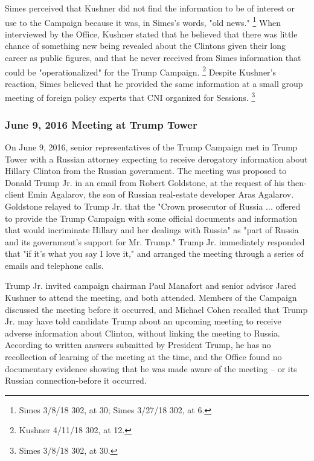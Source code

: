 Simes perceived that Kushner did not find the information to be of interest or use to the Campaign because it was, in Simes's words, "old news."%
\footnote{Simes 3/8/18 302, at 30; 
Simes 3/27/18 302, at 6.}
When interviewed by the Office, Kushner stated that he believed that there was little chance of something new being revealed about the Clintons given their long career as public figures, and that he never received from Simes information that could be "operationalized" for the Trump Campaign.%
\footnote{Kushner 4/11/18 302, at 12.}
Despite Kushner's reaction, Simes believed that he provided the same information at a small group meeting of foreign policy experts that CNI organized for Sessions.%
\footnote{Simes 3/8/18 302, at 30.}

\subsubsection{June 9, 2016 Meeting at Trump Tower}

On June 9, 2016, senior representatives of the Trump Campaign met in Trump Tower with a Russian attorney expecting to receive derogatory information about Hillary Clinton from the Russian government.
The meeting was proposed to Donald Trump Jr. in an email from Robert Goldstone, at the request of his then-client Emin Agalarov, the son of Russian real-estate developer Aras Agalarov.
Goldstone relayed to Trump Jr. that the "Crown prosecutor of Russia ... offered to provide the Trump Campaign with some official documents and information that would incriminate Hillary and her dealings with Russia" as "part of Russia and its government's support for Mr. Trump."
Trump Jr. immediately responded that "if it's what you say I love it," and arranged the meeting through a series of emails and telephone calls.

Trump Jr. invited campaign chairman Paul Manafort and senior advisor Jared Kushner to attend the meeting, and both attended.
Members of the Campaign discussed the meeting before it occurred, and Michael Cohen recalled that Trump Jr. may have told candidate Trump about an upcoming meeting to receive adverse information about Clinton, without linking the meeting to Russia.
According to written answers submitted by President Trump, he has no recollection of learning of the meeting at the time, and the Office found no documentary evidence showing that he was made aware of the meeting -- or its Russian connection-before it occurred.

